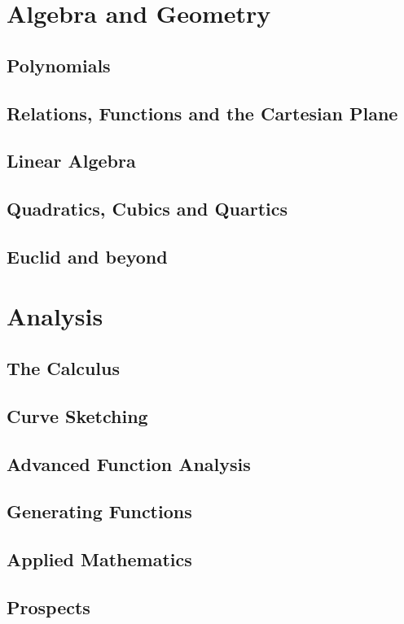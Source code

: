 \documentclass{scrbook}
\begin{document}
\part{Algebra and Geometry}

\chapter{Polynomials} %

\chapter{Relations, Functions and the Cartesian Plane} %

\chapter{Linear Algebra} %

\chapter{Quadratics, Cubics and Quartics} %

\chapter{Euclid and beyond} %

\part{Analysis}

\chapter{The Calculus} %

\chapter{Curve Sketching} %
\chapter{Advanced Function Analysis} %
\chapter{Generating Functions} %
\chapter{Applied Mathematics} %
\chapter{Prospects} %
\end{document}
